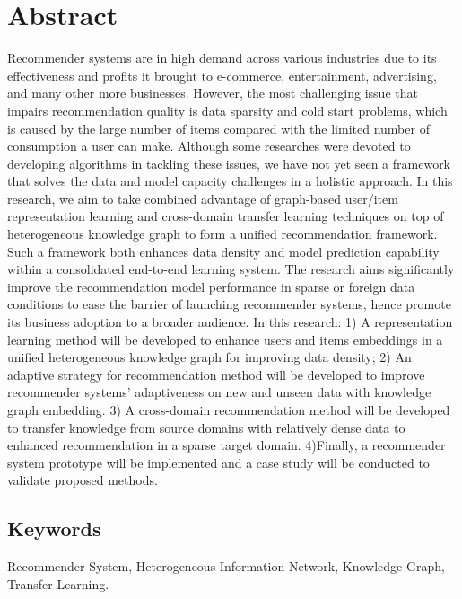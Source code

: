 \section*{Abstract}
Recommender systems are in high demand across various industries due to its effectiveness and profits it brought to e-commerce, entertainment, advertising, and many other more businesses. However, the most challenging issue that impairs recommendation quality is data sparsity and cold start problems, which is caused by the large number of items compared with the limited number of consumption a user can make. Although some researches were devoted to developing algorithms in tackling these issues, we have not yet seen a framework that solves the data and model capacity challenges in a holistic approach. In this research, we aim to take combined advantage of graph-based user/item representation learning and cross-domain transfer learning techniques on top of heterogeneous knowledge graph to form a unified recommendation framework. Such a framework both enhances data density and model prediction capability within a consolidated end-to-end learning system. The research aims significantly improve the recommendation model performance in sparse or foreign data conditions to ease the barrier of launching recommender systems, hence promote its business adoption to a broader audience. In this research: 1) A representation learning method will be developed to enhance users and items embeddings in a unified heterogeneous knowledge graph for improving data density; 2) An adaptive strategy for recommendation method will be developed to improve recommender systems’ adaptiveness on new and unseen data with knowledge graph embedding. 3) A cross-domain recommendation method will be developed to transfer knowledge from source domains with relatively dense data to  enhanced recommendation in a sparse target domain. 4)Finally, a recommender system prototype will be implemented and a case study will be conducted to validate proposed methods. 

\subsection*{Keywords} 
Recommender System, Heterogeneous Information Network, Knowledge Graph, Transfer Learning.